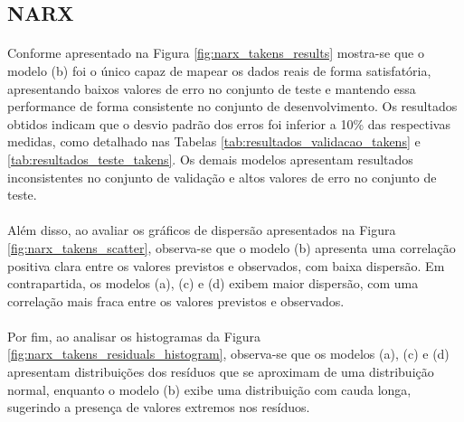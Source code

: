 \subsection{\acs{NARX}}
\paragraph{} Conforme apresentado na Figura \ref{fig:narx_takens_results} mostra-se que o modelo (b) foi o único capaz de mapear os dados reais de forma satisfatória, apresentando baixos valores de erro no conjunto de teste e mantendo essa performance de forma consistente no conjunto de desenvolvimento. Os resultados obtidos indicam que o desvio padrão dos erros foi inferior a 10\% das respectivas medidas, como detalhado nas Tabelas \ref{tab:resultados_validacao_takens} e \ref{tab:resultados_teste_takens}. Os demais modelos apresentam resultados inconsistentes no conjunto de validação e altos valores de erro no conjunto de teste. 
\paragraph{} Além disso, ao avaliar os gráficos de dispersão apresentados na Figura \ref{fig:narx_takens_scatter}, observa-se que o modelo (b) apresenta uma correlação positiva clara entre os valores previstos e observados, com baixa dispersão. Em contrapartida, os modelos (a), (c) e (d) exibem maior dispersão, com uma correlação mais fraca entre os valores previstos e observados.
\paragraph{} Por fim, ao analisar os histogramas da Figura \ref{fig:narx_takens_residuals_histogram}, observa-se que os modelos (a), (c) e (d) apresentam distribuições dos resíduos que se aproximam de uma distribuição normal, enquanto o modelo (b) exibe uma distribuição com cauda longa, sugerindo a presença de valores extremos nos resíduos.


